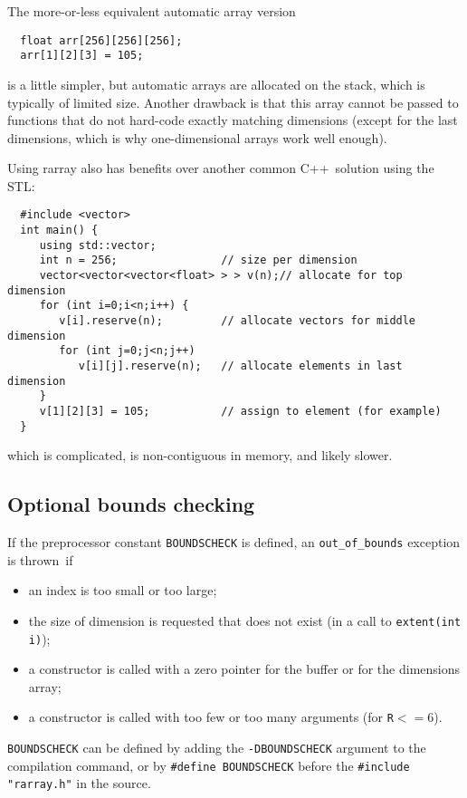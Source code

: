 \documentclass[12pt,twoside]{article}
\newcommand{\cxx}{C{++}}
\begin{document}
The more-or-less equivalent automatic array version 
\vspace{-5pt}\begin{framed}\vspace{-14pt}%
\begin{verbatim}
  float arr[256][256][256]; 
  arr[1][2][3] = 105;
\end{verbatim}
\vspace{-14pt}\end{framed}
\noindent
is a little simpler, but automatic arrays are allocated on the stack,
which is typically of limited size. Another drawback is that this array cannot be passed to functions that do
not hard-code exactly matching dimensions (except for the last
dimensions, which is why one-dimensional arrays work well enough).

Using rarray also has benefits over another common \cxx\ 
solution using the STL:
\vspace{-5pt}\begin{framed}\vspace{-14pt}%
\begin{verbatim}
  #include <vector>
  int main() {
     using std::vector;
     int n = 256;                // size per dimension
     vector<vector<vector<float> > > v(n);// allocate for top dimension
     for (int i=0;i<n;i++) {
        v[i].reserve(n);         // allocate vectors for middle dimension
        for (int j=0;j<n;j++) 
           v[i][j].reserve(n);   // allocate elements in last dimension
     }
     v[1][2][3] = 105;           // assign to element (for example)
  }
\end{verbatim}
\vspace{-14pt}\end{framed}\vspace{-8pt}
\noindent
which is complicated, is non-contiguous in memory, and likely
slower. 

\subsection{Optional bounds checking}

If the preprocessor constant \texttt{{\tt BOUNDSCHECK}} is defined, an
\texttt{out\_of\_bounds} exception is thrown~if
\begin{itemize}\itemsep0pt\parskip3pt
\item an index is too small or too large;
\item the size of dimension is requested that does not exist (in a call to \texttt{extent(int i)});
\item a constructor is called with a zero pointer for the buffer or for the dimensions array;
\item a constructor is called with too few or too many arguments (for \texttt{R}$<=6$).
\end{itemize}
\texttt{{\tt BOUNDSCHECK}} can be defined by
adding the {\tt -DBOUNDSCHECK} argument to the compilation command, or
by \texttt{{\tt\#define BOUNDSCHECK}} before
the \texttt{{\tt\#include "rarray.h"}} in the source.
\end{document}
